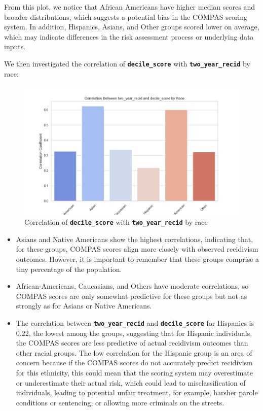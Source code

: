 From this plot, we notice that African Americans have higher median scores and broader distributions, which suggests a potential bias in the COMPAS scoring system. In addition, Hispanics, Asians, and Other groups scored lower on average, which may indicate differences in the risk assessment process or underlying data inputs.


We then investigated the correlation of \textbf{\texttt{decile\_score}} with \textbf{\texttt{two\_year\_recid}} by race:

\begin{figure}[H]
	\centering
	\includegraphics[width=0.9\linewidth]{img/correlation_by_race}
	\caption{Correlation of \textbf{\texttt{decile\_score}} with \textbf{\texttt{two\_year\_recid}} by race}
	\label{fig:correlationbyrace}
\end{figure}

\begin{itemize}
	\item Asians and Native Americans show the highest correlations, indicating that, for these groups, COMPAS scores align more closely with observed recidivism outcomes. However, it is important to remember that these groups comprise a tiny percentage of the population.
	
	\item African-Americans, Caucasians, and Others have moderate correlations, so COMPAS scores are only somewhat predictive for these groups but not as strongly as for Asians or Native Americans.
	
	\item The correlation between \textbf{\texttt{two\_year\_recid}} and \textbf{\texttt{decile\_score}} for Hispanics is 0.22, the lowest among the groups, suggesting that for Hispanic individuals, the COMPAS scores are less predictive of actual recidivism outcomes than other racial groups. The low correlation for the Hispanic group is an area of concern because if the COMPAS scores do not accurately predict recidivism for this ethnicity, this could mean that the scoring system may overestimate or underestimate their actual risk, which could lead to misclassification of individuals, leading to potential unfair treatment, for example, harsher parole conditions or sentencing, or allowing more criminals on the streets.
\end{itemize}

